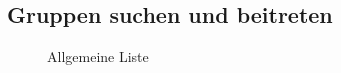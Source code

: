 \subsection{Gruppen suchen und beitreten}
\label{subsec:gruppenSuchenBeitreten}
\begin{figure}[h!]
 \centering
 \caption{Allgemeine Liste}
 \label{fig:allgemeineListe}
\end{figure}
